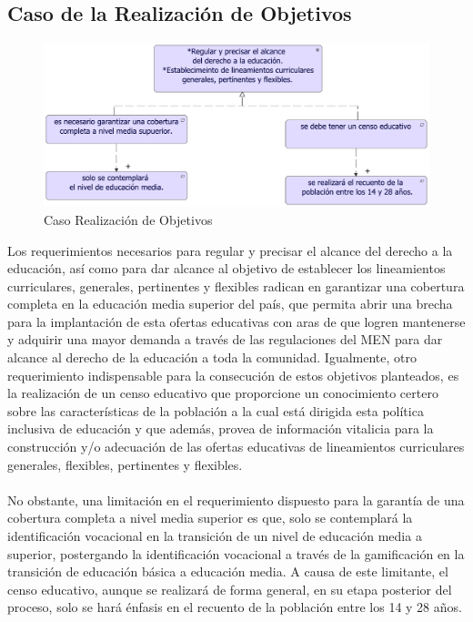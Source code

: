 \newpage

\subsection{Caso de la Realización de Objetivos}
\begin{figure}[h!]
	\centering
	\includegraphics[width=1.0\linewidth]{imgs/motivacion/realizacionObj/realizacion.pdf}
	\caption{Caso Realización de Objetivos}
\end{figure}

Los requerimientos necesarios para regular y precisar el alcance del derecho a la educación, así como para dar alcance al objetivo de establecer los lineamientos curriculares, generales, pertinentes y flexibles radican en garantizar una cobertura completa en la educación media superior del país, que permita abrir una brecha para la implantación de esta ofertas educativas con aras de que logren mantenerse y adquirir una mayor demanda a través de las regulaciones del MEN para dar alcance al derecho de la educación a toda la comunidad. Igualmente, otro requerimiento indispensable para la consecución de estos objetivos planteados, es la realización de un censo educativo que proporcione un conocimiento certero sobre las características de la población a la cual está dirigida esta política inclusiva de educación y que además, provea de información vitalicia para la construcción y/o adecuación de las ofertas educativas de lineamientos curriculares generales, flexibles, pertinentes y flexibles. \\ \\
No obstante, una limitación en el requerimiento dispuesto para la garantía de una cobertura completa a nivel media superior es que, solo se contemplará la identificación vocacional en la transición de un nivel de educación media a superior, postergando la identificación vocacional a través de la gamificación en la transición de educación básica a educación media. A causa de este limitante, el censo educativo, aunque se realizará de forma general, en su etapa posterior del proceso, solo se hará énfasis en el recuento de la población entre los 14 y 28 años.